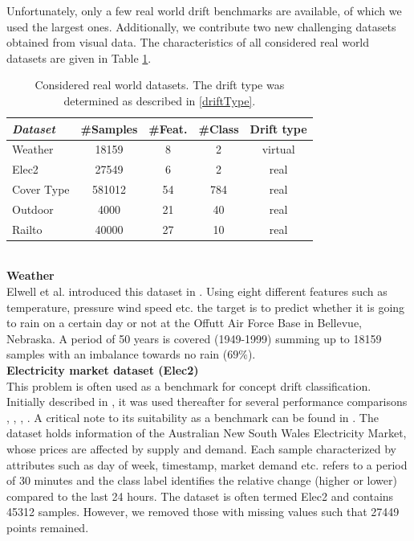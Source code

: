 \documentclass[conference]{IEEEtran}
\begin{document}
Unfortunately, only a few real world drift benchmarks are available, of which we used the largest ones. Additionally, we contribute two new challenging datasets obtained from visual data.
The characteristics of all considered real world datasets are given in Table \ref{tab:realDatasets}.
\begin{table}
\caption{Considered real world datasets. The drift type was determined as described in \ref{driftType}.}
\label{tab:realDatasets}
\centering
\begin{tabular}{l|cccc}
\textit{Dataset} & \#Samples&\#Feat.&\#Class&Drift type\\\hline
Weather & 18159 & 8 & 2 & virtual\\
Elec2 & 27549 & 6 & 2 & real\\
Cover Type & 581012 & 54 & 784 & real\\
Outdoor & 4000 & 21 & 40 & real\\
Railto & 40000 & 27 & 10 & real\\
\end{tabular}
\end{table}
\\\textbf{Weather}\\
Elwell et al. introduced this dataset in \cite{5975223}. Using eight different features such as temperature, pressure wind speed etc. the target is to predict 
whether it is going to rain on a certain day or not at the Offutt Air Force Base in Bellevue, Nebraska.
A period of 50 years is covered (1949-1999) summing up to 18159 samples with an imbalance towards no rain ($69\%$).\\
\textbf{Electricity market dataset (Elec2)}\\
This problem is often used as a benchmark for concept drift classification. Initially described in \cite{harries1999splice}, it was used thereafter for several performance comparisons \cite{baena2006early}, \cite{kuncheva2008adaptive}, \cite{Bifet:2013:EDS:2480362.2480516}, \cite{gama2004learning}. 
A critical note to its suitability as a benchmark can be found in \cite{zliobaite2013good}.
The dataset holds information of the Australian New South Wales Electricity Market, whose prices are affected by supply and demand. 
Each sample characterized by attributes such as day of week, timestamp, market demand etc. refers to a period of 30 minutes and the class label identifies the relative change (higher or lower) compared to the last 24 hours.
The dataset is often termed Elec2 and contains 45312 samples. However, we removed those with missing values such that 27449 points remained.\\
\end{document}
